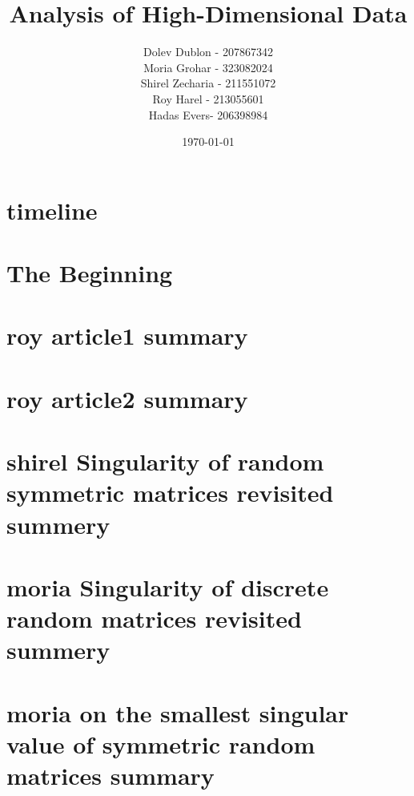 \documentclass[12pt]{article}
\title{\textbf{Analysis of High-Dimensional Data}}
\author{
    Dolev Dublon - 207867342\\
    Moria Grohar - 323082024\\ 
    Shirel Zecharia - 211551072\\
    Roy Harel - 213055601\\
    Hadas Evers- 206398984
}
\date{\today}
\begin{document}
\maketitle


\tableofcontents

\newpage





\section{timeline}



\section{The Beginning}



\section{roy article1 summary}



\section{roy article2 summary}



\section{shirel Singularity of random symmetric matrices revisited summery}



\section{moria Singularity of discrete random matrices revisited summery}



\section{moria on the smallest singular value of symmetric random matrices summary}
\end{document}
